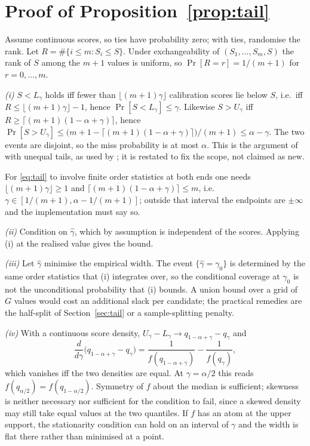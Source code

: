 \documentclass[journal]{IEEEtran}
\begin{document}
\appendices
\section{Proof of Proposition~\ref{prop:tail}}
\label{app:proof}

Assume continuous scores, so ties have probability zero; with ties, randomise the rank. Let
$R=\#\{i\le m:S_i\le S\}$. Under exchangeability of $(S_1,\dots,S_m,S)$ the rank of $S$ among
the $m+1$ values is uniform, so $\Pr[R=r]=1/(m+1)$ for $r=0,\dots,m$.

\emph{(i)} $S<L_\gamma$ holds iff fewer than $\lfloor(m+1)\gamma\rfloor$ calibration scores lie
below $S$, i.e.\ iff $R\le\lfloor(m+1)\gamma\rfloor-1$, hence $\Pr[S<L_\gamma]\le\gamma$.
Likewise $S>U_\gamma$ iff $R\ge\lceil(m+1)(1-\alpha+\gamma)\rceil$, hence
$\Pr[S>U_\gamma]\le\bigl(m+1-\lceil(m+1)(1-\alpha+\gamma)\rceil\bigr)/(m+1)\le\alpha-\gamma$.
The two events are disjoint, so the miss probability is at most $\alpha$. This is the argument
of \cite{vovk2005} with unequal tails, as used by \cite{romano2019}; it is restated to fix the
scope, not claimed as new.

For \eqref{eq:tail} to involve finite order statistics at both ends one needs
$\lfloor(m+1)\gamma\rfloor\ge1$ and $\lceil(m+1)(1-\alpha+\gamma)\rceil\le m$, i.e.\
$\gamma\in[1/(m+1),\alpha-1/(m+1)]$; outside that interval the endpoints are $\pm\infty$ and the
implementation must say so.

\emph{(ii)} Condition on $\hat\gamma$, which by assumption is independent of the scores.
Applying (i) at the realised value gives the bound.

\emph{(iii)} Let $\hat\gamma$ minimise the empirical width. The event
$\{\hat\gamma=\gamma_0\}$ is determined by the same order statistics that (i) integrates over,
so the conditional coverage at $\gamma_0$ is not the unconditional probability that (i) bounds.
A union bound over a grid of $G$ values would cost an additional slack per candidate; the
practical remedies are the half-split of Section~\ref{sec:tail} or a sample-splitting penalty.

\emph{(iv)} With a continuous score density,
$U_\gamma-L_\gamma\to q_{1-\alpha+\gamma}-q_\gamma$ and
\[
\frac{d}{d\gamma}\bigl(q_{1-\alpha+\gamma}-q_\gamma\bigr)
=\frac{1}{f(q_{1-\alpha+\gamma})}-\frac{1}{f(q_\gamma)},
\]
which vanishes iff the two densities are equal. At $\gamma=\alpha/2$ this reads
$f(q_{\alpha/2})=f(q_{1-\alpha/2})$. Symmetry of $f$ about the median is sufficient; skewness
is neither necessary nor sufficient for the condition to fail, since a skewed density may
still take equal values at the two quantiles. If $f$ has an atom at the upper support, the
stationarity condition can hold on an interval of $\gamma$ and the width is flat there rather
than minimised at a point.
\end{document}

